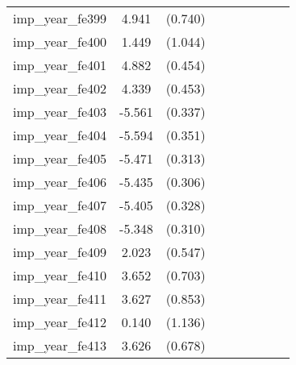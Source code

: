 {\begin{tabular}{l*{4}{cc}}
imp\_year\_fe399&    4.941\sym{***}&  (0.740)&                  &         &                  &         &                  &         \\
imp\_year\_fe400&    1.449         &  (1.044)&                  &         &                  &         &                  &         \\
imp\_year\_fe401&    4.882\sym{***}&  (0.454)&                  &         &                  &         &                  &         \\
imp\_year\_fe402&    4.339\sym{***}&  (0.453)&                  &         &                  &         &                  &         \\
imp\_year\_fe403&   -5.561\sym{***}&  (0.337)&                  &         &                  &         &                  &         \\
imp\_year\_fe404&   -5.594\sym{***}&  (0.351)&                  &         &                  &         &                  &         \\
imp\_year\_fe405&   -5.471\sym{***}&  (0.313)&                  &         &                  &         &                  &         \\
imp\_year\_fe406&   -5.435\sym{***}&  (0.306)&                  &         &                  &         &                  &         \\
imp\_year\_fe407&   -5.405\sym{***}&  (0.328)&                  &         &                  &         &                  &         \\
imp\_year\_fe408&   -5.348\sym{***}&  (0.310)&                  &         &                  &         &                  &         \\
imp\_year\_fe409&    2.023\sym{***}&  (0.547)&                  &         &                  &         &                  &         \\
imp\_year\_fe410&    3.652\sym{***}&  (0.703)&                  &         &                  &         &                  &         \\
imp\_year\_fe411&    3.627\sym{***}&  (0.853)&                  &         &                  &         &                  &         \\
imp\_year\_fe412&    0.140         &  (1.136)&                  &         &                  &         &                  &         \\
imp\_year\_fe413&    3.626\sym{***}&  (0.678)&                  &         &                  &         &                  &         \\

\end{tabular}}
